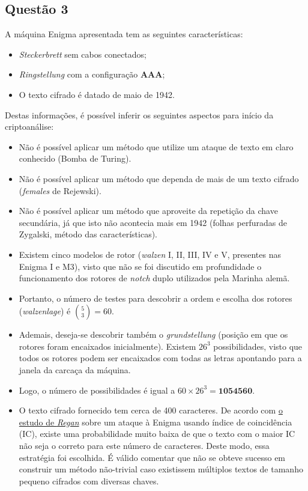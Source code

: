 \documentclass{article}
\begin{document}
\subsection*{Questão 3}
A máquina Enigma apresentada tem as seguintes características:
\begin{itemize}
    \item \textit{Steckerbrett} sem cabos conectados;
    \item \textit{Ringstellung} com a configuração \textbf{AAA};
    \item O texto cifrado é datado de maio de 1942.
\end{itemize}
    Destas informações, é possível inferir os seguintes aspectos para início da criptoanálise:
\begin{itemize}
    \item Não é possível aplicar um método que utilize um ataque de texto em claro conhecido (Bomba de Turing).
    \item Não é possível aplicar um método que dependa de mais de um texto cifrado (\textit{females} de Rejewski).
    \item Não é possível aplicar um método que aproveite da repetição da chave secundária, já que isto não acontecia mais em 1942 (folhas perfuradas de Zygalski, método das características).
    \item Existem cinco modelos de rotor (\textit{walzen} I, II, III, IV e V, presentes nas Enigma I e M3), visto que não se foi discutido em profundidade o funcionamento dos rotores de \textit{notch} duplo utilizados pela Marinha alemã.
    \item Portanto, o número de testes para descobrir a ordem e escolha dos rotores (\textit{walzenlage}) é $\binom{5}{3} = 60$.
    \item Ademais, deseja-se descobrir também o \textit{grundstellung} (posição em que os rotores foram encaixados inicialmente). Existem $26^3$ possibilidades, visto que todos os rotores podem ser encaixados com todas as letras apontando para a janela da carcaça da máquina.
    \item Logo, o número de possibilidades é igual a $60 \times 26^3 = \textbf{1054560}$.
    \item O texto cifrado fornecido tem cerca de 400 caracteres. De acordo com \href{http://www.cs.rochester.edu/u/brown/Crypto/studprojs/Enigma.html}{o estudo de \textit{Regan}} sobre um ataque à Enigma usando índice de coincidência (IC), existe uma probabilidade muito baixa de que o texto com o maior IC não seja o correto para este número de caracteres. Deste modo, essa estratégia foi escolhida. É válido comentar que não se obteve sucesso em construir um método não-trivial caso existissem múltiplos textos de tamanho pequeno cifrados com diversas chaves.
\end{itemize}
\end{document}

